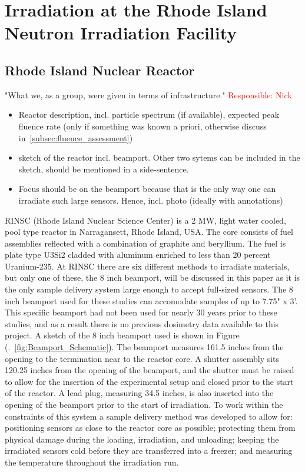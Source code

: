 \section{Irradiation at the Rhode Island Neutron Irradiation Facility}
\label{sec:irradiation}

\subsection{Rhode Island Nuclear Reactor}
\label{subsec:RINSC}
"What we, as a group, were given in terms of infrastructure." \textcolor{red}{Responsible: Nick}
\begin{itemize}
  \item Reactor description, incl. particle spectrum (if available), expected peak fluence rate (only if something was known a priori, otherwise discuss in~\ref{subsec:fluence_assessment})
  \item sketch of the reactor incl. beamport. Other two sytems can be included in the sketch, should be mentioned in a side-sentence.
  \item Focus should be on the beamport because that is the only way one can irradiate such large sensors. Hence, incl. photo (ideally with annotations)
\end{itemize}

RINSC (Rhode Island Nuclear Science Center) is a 2 MW, light water cooled, pool type reactor in Narragansett, Rhode Island, USA.
The core consists of fuel assemblies reflected with a combination of graphite and beryllium.
The fuel is plate type U3Si2 cladded with aluminum enriched to less than 20 percent Uranium-235.
At RINSC there are six different methods to irradiate materials, but only one of these, the 8 inch beamport, will be discussed in this paper as it is the only sample delivery system large enough to accept full-sized sensors.
The 8 inch beamport used for these studies can accomodate samples of up to 7.75" x 3'.
This specific beamport had not been used for nearly 30 years prior to these studies, and as a result there is no previous dosimetry data available to this project.
A sketch of the 8 inch beamport used is shown in Figure (.~\ref{fig:Beamport_Schematic}).
The beamport measures 161.5 inches from the opening to the termination near to the reactor core.
A shutter assembly sits 120.25 inches from the opening of the beamport, and the shutter must be raised to allow for the insertion of the experimental setup and closed prior to the start of the reactor.
A lead plug, measuring 34.5 inches, is also inserted into the opening of the beamport prior to the start of irradiation.
To work within the constraints of this system a sample delivery method was developed to allow for: positioning sensors as close to the reactor core as possible; protecting them from physical damage during the loading, irradiation, and unloading; keeping the irradiated sensors cold before they are transferred into a freezer; and measuring the temperature throughout the irradiation run.   

